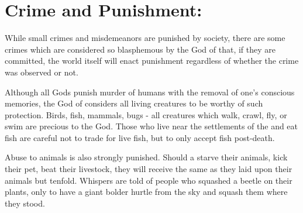 \documentclass[blue]{GL2020}
\begin{document}
\section*{Crime and Punishment:}

While small crimes and misdemeanors are punished by society, there are some crimes which are considered so blasphemous by the God of \pSunCh{} that, if they are committed, the world itself will enact punishment regardless of whether the crime was observed or not.

Although all Gods punish murder of humans with the removal of one's conscious memories, the God of \pSunCh{} considers all living creatures to be worthy of such protection.  Birds, fish, mammals, bugs - all creatures which walk, crawl, fly, or swim are precious to the God.  Those \pSunCh{} who live near the settlements of the \pVikings{} and eat fish are careful not to trade for live fish, but to only accept fish post-death.

Abuse to animals is also strongly punished.  Should a \pSunCh{} starve their animals, kick their pet, beat their livestock, they will receive the same as they laid upon their animals but tenfold.  Whispers are told of people who squashed a beetle on their plants, only to have a giant bolder hurtle from the sky and squash them where they stood.  
\end{document}
